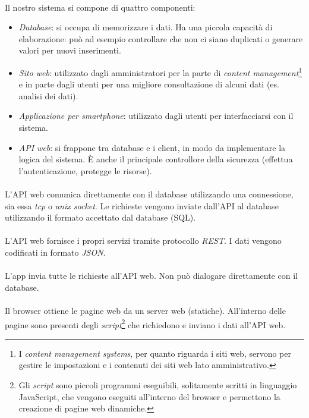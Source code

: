 \documentclass[12pt,a4paper,twoside,english,italian]{book}
\begin{document}
\paragraph{} Il nostro sistema si compone di quattro componenti:
\begin{itemize}
    \item \emph{Database}: si occupa di memorizzare i dati. Ha una piccola capacità di elaborazione: può ad esempio controllare che non ci siano duplicati o generare valori per nuovi inserimenti.
    \item \emph{Sito web}: utilizzato dagli amministratori per la parte di \emph{content management}\footnote{I \emph{content management systems}, per quanto riguarda i siti web, servono per gestire le impostazioni e i contenuti dei siti web lato amministrativo.} e in parte dagli utenti per una migliore consultazione di alcuni dati (es. analisi dei dati).
    
    \newpage
    
    \item \emph{Applicazione per smartphone}: utilizzato dagli utenti per interfacciarsi con il sistema.
    \item \emph{API web}: si frappone tra database e i client, in modo da implementare la logica del sistema. È anche il principale controllore della sicurezza (effettua l'autenticazione, protegge le risorse). 
\end{itemize}

\paragraph{} L'API web comunica direttamente con il database utilizzando una connessione, sia essa \emph{tcp} o \emph{unix socket}. Le richieste vengono inviate dall'API al database utilizzando il formato accettato dal database (SQL). 

\paragraph{} L'API web fornisce i propri servizi tramite protocollo \emph{REST}. I dati vengono codificati in formato \emph{JSON}. 

\paragraph{} L'app invia tutte le richieste all'API web. Non può dialogare direttamente con il database.

\paragraph{} Il browser ottiene le pagine web da un server web (statiche). All'interno delle pagine sono presenti degli \emph{script}\footnote{Gli \emph{script} sono piccoli programmi eseguibili, solitamente scritti in linguaggio JavaScript, che vengono eseguiti all'interno del browser e permettono la creazione di pagine web dinamiche.} che richiedono e inviano i dati all'API web. 
\end{document}
